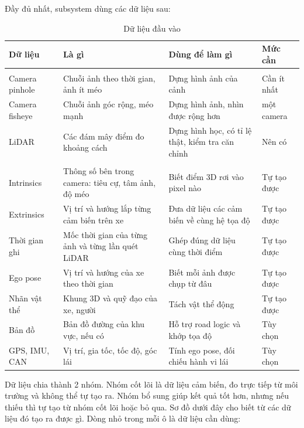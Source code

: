 Đầy đủ nhất, subsystem dùng các dữ liệu sau:

\begin{table}[H]
  \centering
  \small
  \caption{Dữ liệu đầu vào}
  \begin{tabularx}{\linewidth}{>{\raggedright\arraybackslash}p{2.9cm} >{\raggedright\arraybackslash}X >{\raggedright\arraybackslash}X l}
    \toprule
    \textbf{Dữ liệu} & \textbf{Là gì} & \textbf{Dùng để làm gì} & \textbf{Mức cần} \\
    \midrule
    \multicolumn{4}{l}{\textbf{Dữ liệu cốt lõi}} \\
    Camera pinhole & Chuỗi ảnh theo thời gian, ảnh ít méo & Dựng hình ảnh của cảnh & Cần ít nhất \\
    \addlinespace
    Camera fisheye & Chuỗi ảnh góc rộng, méo mạnh & Dựng hình ảnh, nhìn được rộng hơn & một camera \\
    \addlinespace
    LiDAR & Các đám mây điểm đo khoảng cách & Dựng hình học, có tỉ lệ thật, kiểm tra căn chỉnh & Nên có \\
    \midrule
    \multicolumn{4}{l}{\textbf{Dữ liệu bổ sung}} \\
    Intrinsics & Thông số bên trong camera: tiêu cự, tâm ảnh, độ méo & Biết điểm 3D rơi vào pixel nào & Tự tạo được \\
    \addlinespace
    Extrinsics & Vị trí và hướng lắp từng cảm biến trên xe & Đưa dữ liệu các cảm biến về cùng hệ tọa độ & Tự tạo được \\
    \addlinespace
    Thời gian ghi & Mốc thời gian của từng ảnh và từng lần quét LiDAR & Ghép đúng dữ liệu cùng thời điểm & Tự tạo được \\
    \addlinespace
    Ego pose & Vị trí và hướng của xe theo thời gian & Biết mỗi ảnh được chụp từ đâu & Tự tạo được \\
    \addlinespace
    Nhãn vật thể & Khung 3D và quỹ đạo của xe, người & Tách vật thể động & Tự tạo được \\
    \addlinespace
    Bản đồ & Bản đồ đường của khu vực, nếu có & Hỗ trợ road logic và khớp tọa độ & Tùy chọn \\
    \addlinespace
    GPS, IMU, CAN & Vị trí, gia tốc, tốc độ, góc lái & Tính ego pose, đối chiếu hành vi lái & Tùy chọn \\
    \bottomrule
  \end{tabularx}
\end{table}

Dữ liệu chia thành 2 nhóm. Nhóm cốt lõi là dữ liệu cảm biến, đo trực tiếp từ môi trường và không thể tự tạo ra. Nhóm bổ sung giúp kết quả tốt hơn, nhưng nếu thiếu thì tự tạo từ nhóm cốt lõi hoặc bỏ qua.
Sơ đồ dưới đây cho biết từ các dữ liệu đó tạo ra được gì. Dòng nhỏ trong mỗi ô là dữ liệu cần dùng:

